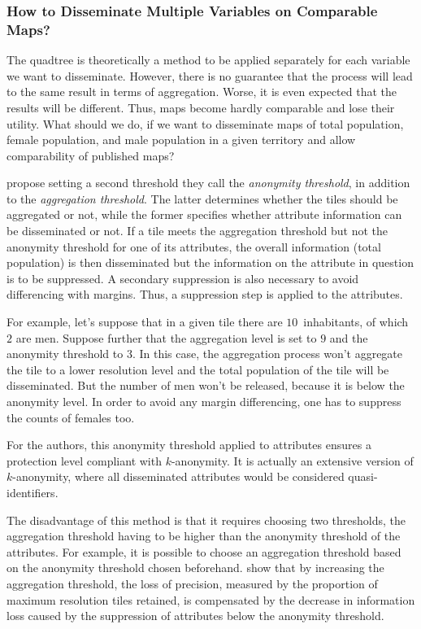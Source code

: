 \subsubsection{How to Disseminate Multiple Variables on Comparable Maps?}

The quadtree is theoretically a method to be applied separately for each variable we want to disseminate. However, there is no guarantee that the process will lead to the same result in terms of aggregation. Worse, it is even expected that the results will be different. Thus, maps become hardly comparable and lose their utility. What should we do, if we want to disseminate maps of total population, female population, and male population in a given territory and allow comparability of published maps?

\cite{Lagonigro_Oller_Martori_2017} propose setting a second threshold they call the \emph{anonymity threshold}, in addition to the \emph{aggregation threshold}. The latter determines whether the tiles should be aggregated or not, while the former specifies whether attribute information can be disseminated or not. If a tile meets the aggregation threshold but not the anonymity threshold for one of its attributes, the overall information (total population) is then disseminated but the information on the attribute in question is to be suppressed. A secondary suppression is also necessary to avoid differencing with margins. Thus, a suppression step is applied to the attributes.

For example, let's suppose that in a given tile there are $10$~inhabitants, of which $2$ are men. Suppose further that the aggregation level is set to $9$ and the anonymity threshold to $3$. In this case, the aggregation process won't aggregate the tile to a lower resolution level and the total population of the tile will be disseminated. But the number of men won't be released, because it is below the anonymity level. In order to avoid any margin differencing, one has to suppress the counts of females too.

 For the authors, this anonymity threshold applied to attributes ensures a protection level compliant with $k$-anonymity. It is actually an extensive version of $k$-anonymity, where all disseminated attributes would be considered quasi-identifiers.

The disadvantage of this method is that it requires choosing two thresholds, the aggregation threshold having to be higher than the anonymity threshold of the attributes. For example, it is possible to choose an aggregation threshold based on the anonymity threshold chosen beforehand. \cite{Lagonigro_Oller_Martori_2017} show that by increasing the aggregation threshold, the loss of precision, measured by the proportion of maximum resolution tiles retained, is compensated by the decrease in information loss caused by the suppression of attributes below the anonymity threshold.

